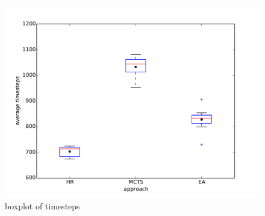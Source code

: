 \begin{figure}[H]
\centering
\includegraphics[scale=0.3]{images/eval_all_timesteps.pdf}
\caption{boxplot of timesteps}
\label{fig:eval_all_timesteps}
\end{figure}

